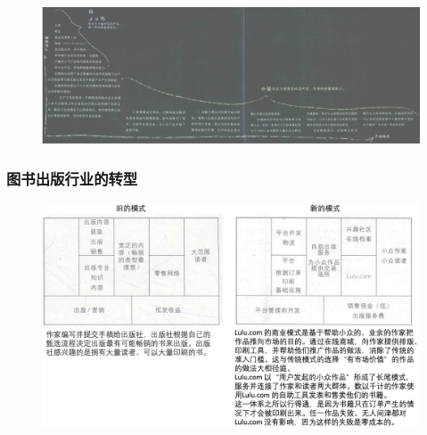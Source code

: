     \begin{figure}[H]
		\centering
        \vspace{-0.5em}
		\includegraphics[width=\textwidth]{img/长尾概念的提出.png}
        \vspace{-0.5em}
	\end{figure}

    \subsubsection{图书出版行业的转型}
    \begin{figure}[H]
		\centering
        \vspace{-0.5em}
		\includegraphics[width=\textwidth]{img/图书出版行业的转型.png}
        \vspace{-0.5em}
	\end{figure}

